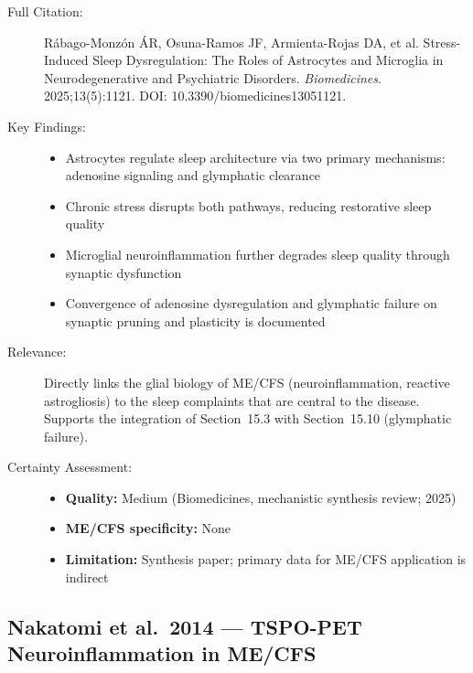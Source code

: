 \begin{description}
    \item[Full Citation:] R\'{a}bago-Monz\'{o}n \'{A}R, Osuna-Ramos JF, Armienta-Rojas DA, et al. Stress-Induced Sleep Dysregulation: The Roles of Astrocytes and Microglia in Neurodegenerative and Psychiatric Disorders. \textit{Biomedicines}. 2025;13(5):1121. DOI: 10.3390/biomedicines13051121.
    \item[Key Findings:]
    \begin{itemize}
        \item Astrocytes regulate sleep architecture via two primary mechanisms: adenosine signaling and glymphatic clearance
        \item Chronic stress disrupts both pathways, reducing restorative sleep quality
        \item Microglial neuroinflammation further degrades sleep quality through synaptic dysfunction
        \item Convergence of adenosine dysregulation and glymphatic failure on synaptic pruning and plasticity is documented
    \end{itemize}
    \item[Relevance:] Directly links the glial biology of ME/CFS (neuroinflammation, reactive astrogliosis) to the sleep complaints that are central to the disease. Supports the integration of Section~15.3 with Section~15.10 (glymphatic failure).
    \item[Certainty Assessment:]
    \begin{itemize}
        \item \textbf{Quality:} Medium (Biomedicines, mechanistic synthesis review; 2025)
        \item \textbf{ME/CFS specificity:} None
        \item \textbf{Limitation:} Synthesis paper; primary data for ME/CFS application is indirect
    \end{itemize}
\end{description}

\subsection{Nakatomi et al.\ 2014 --- TSPO-PET Neuroinflammation in ME/CFS}

